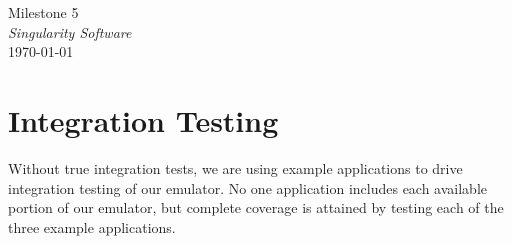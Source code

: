 \documentclass[12pt]{article}
\begin{document}
\begin{center}
	\LARGE{Milestone 5} \\
	\Large{\textit{Singularity Software}} \\
	\vspace{.05in}
	\normalsize{\today} \\
\end{center}

\section*{Integration Testing}
Without true integration tests, we are using example applications to drive integration testing of our emulator. No one application includes each available portion of our emulator, but complete coverage is attained by testing each of the three example applications.
\end{document}
